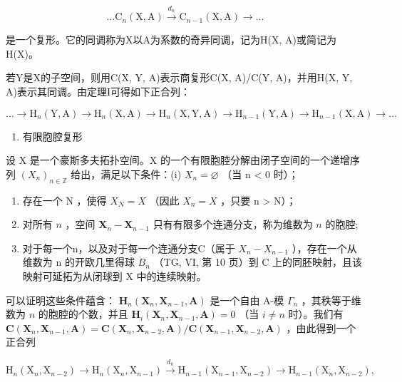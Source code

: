 \[
\dots \mathrm{C} _ {n} (\mathrm{X}, \mathrm{A}) \xrightarrow {d _ {n}} \mathrm{C} _ {n - 1} (\mathrm{X}, \mathrm{A}) \rightarrow \dots
\]

是一个复形。它的同调称为X以A为系数的奇异同调，记为H(X, A)或简记为H(X)。

若Y是X的子空间，则用C(X, Y, A)表示商复形C(X, A)/C(Y, A)，并用H(X, Y, A)表示其同调。由定理I可得如下正合列：

\[
\dots \rightarrow \mathrm{H} _ {n} (\mathrm{Y}, \mathrm{A}) \rightarrow \mathrm{H} _ {n} (\mathrm{X}, \mathrm{A}) \rightarrow \mathrm{H} _ {n} (\mathrm{X}, \mathrm{Y}, \mathrm{A}) \rightarrow \mathrm{H} _ {n - 1} (\mathrm{Y}, \mathrm{A}) \rightarrow \mathrm{H} _ {n - 1} (\mathrm{X}, \mathrm{A}) \rightarrow \dots
\]

\begin{enumerate}
\def\labelenumi{\arabic{enumi})}
\setcounter{enumi}{1}
\tightlist
\item
  有限胞腔复形
\end{enumerate}

设 X 是一个豪斯多夫拓扑空间。X 的一个有限胞腔分解由闭子空间的一个递增序列 \((X_{n})_{n\in\mathbb{Z}}\) 给出，满足以下条件：(i) \(X_{n} = \varnothing\) （当 n \textless{} 0 时）；

\begin{enumerate}
\def\labelenumi{(\roman{enumi})}
\setcounter{enumi}{1}
\item
  存在一个 N ，使得 \(X_{N} = X\) （因此 \(X_{n} = X\) ，只要 n \textgreater{} N）；
\item
  对所有 \(n\) ，空间 \(\mathbf{X}_{n} - \mathbf{X}_{n-1}\) 只有有限多个连通分支，称为维数为 \(n\) 的胞腔;
\item
  对于每一个n，以及对于每一个连通分支C（属于 \(X_{n} - X_{n-1}\) ），存在一个从维数为 n 的开欧几里得球 \(\dot{B}_{n}\) （TG, VI, 第 10 页）到 C 上的同胚映射，且该映射可延拓为从闭球到 X 中的连续映射。
\end{enumerate}

可以证明这些条件蕴含： \(\mathbf{H}_n(\mathbf{X}_n, \mathbf{X}_{n-1}, \mathbf{A})\) 是一个自由 A-模 \(\Gamma_n\) ，其秩等于维数为 \(n\) 的胞腔的个数，并且 \(\mathbf{H}_i(\mathbf{X}_n, \mathbf{X}_{n-1}, \mathbf{A}) = 0\) （当 \(i \neq n\) 时）。我们有 \(\mathbf{C}(\mathbf{X}_n, \mathbf{X}_{n-1}, \mathbf{A}) = \mathbf{C}(\mathbf{X}_n, \mathbf{X}_{n-2}, \mathbf{A}) / \mathbf{C}(\mathbf{X}_{n-1}, \mathbf{X}_{n-2}, \mathbf{A})\) ，由此得到一个正合列

\[
\mathrm{H} _ {n} \left(\mathrm{X} _ {n}, \mathrm{X} _ {n - 2}\right) \longrightarrow \mathrm{H} _ {n} \left(\mathrm{X} _ {n}, \mathrm{X} _ {n - 1}\right) \xrightarrow {d _ {n}} \mathrm{H} _ {n - 1} \left(\mathrm{X} _ {n - 1}, \mathrm{X} _ {n - 2}\right) \longrightarrow \mathrm{H} _ {n - 1} \left(\mathrm{X} _ {n}, \mathrm{X} _ {n - 2}\right),
\]

